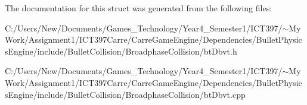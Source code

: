 The documentation for this struct was generated from the following files:\begin{CompactItemize}
\item 
C:/Users/New/Documents/Games\_\-Technology/Year4\_\-Semester1/ICT397/$\sim$My Work/Assignment1/ICT397Carre/CarreGameEngine/Dependencies/BulletPhysicsEngine/include/BulletCollision/BroadphaseCollision/btDbvt.h\item 
C:/Users/New/Documents/Games\_\-Technology/Year4\_\-Semester1/ICT397/$\sim$My Work/Assignment1/ICT397Carre/CarreGameEngine/Dependencies/BulletPhysicsEngine/include/BulletCollision/BroadphaseCollision/btDbvt.cpp\end{CompactItemize}
